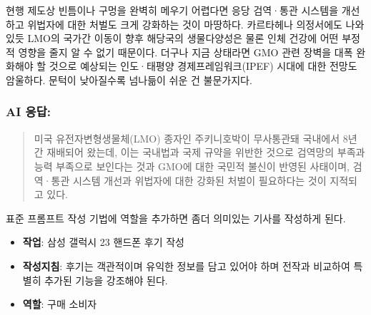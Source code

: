 \documentclass[
  letterpaper,
]{book}
\providecommand{\tightlist}{%
  \setlength{\itemsep}{0pt}\setlength{\parskip}{0pt}}\usepackage{longtable,booktabs,array}
\begin{document}
\begin{tcolorbox}
현행 제도상 빈틈이나 구멍을 완벽히 메우기 어렵다면 응당 검역·통관
시스템을 개선하고 위법자에 대한 처벌도 크게 강화하는 것이 마땅하다.
카르타헤나 의정서에도 나와 있듯 LMO의 국가간 이동이 향후 해당국의
생물다양성은 물론 인체 건강에 어떤 부정적 영향을 줄지 알 수 없기
때문이다. 더구나 지금 상태라면 GMO 관련 장벽을 대폭 완화해야 할 것으로
예상되는 인도·태평양 경제프레임워크(IPEF) 시대에 대한 전망도 암울하다.
문턱이 낮아질수록 넘나듦이 쉬운 건 불문가지다.

\hypertarget{ai-uxc751uxb2f5}{%
\subsubsection*{AI 응답:}\label{ai-uxc751uxb2f5}}

\begin{quote}
미국 유전자변형생물체(LMO) 종자인 주키니호박이 무사통관돼 국내에서 8년간
재배되어 왔는데, 이는 국내법과 국제 규약을 위반한 것으로 검역망의 부족과
능력 부족으로 보인다는 것과 GMO에 대한 국민적 불신이 반영된 사태이며,
검역·통관 시스템 개선과 위법자에 대한 강화된 처벌이 필요하다는 것이
지적되고 있다.
\end{quote}

\end{tcolorbox}

표준 프롬프트 작성 기법에 역할을 추가하면 좀더 의미있는 기사를 작성하게
된다.

\begin{itemize}
\tightlist
\item
  \textbf{작업}: 삼성 갤럭시 23 핸드폰 후기 작성
\item
  \textbf{작성지침}: 후기는 객관적이며 유익한 정보를 담고 있어야 하며
  전작과 비교하여 특별히 추가된 기능을 강조해야 된다.
\item
  \textbf{역할}: 구매 소비자
\end{itemize}
\end{document}

